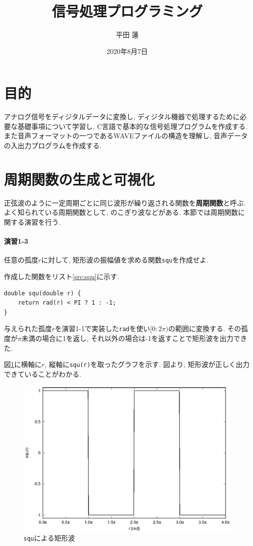\documentclass[titlepage]{jsarticle}
\title{信号処理プログラミング}
\author{平田 蓮}
\date{2020年8月7日}
\begin{document}
\maketitle
\section{目的}
    アナログ信号をディジタルデータに変換し, ディジタル機器で処理するために必要な基礎事項について学習し,
    C言語で基本的な信号処理プログラムを作成する.
    また音声フォーマットの一つであるWAVEファイルの構造を理解し, 音声データの入出力プログラムを作成する.

\section{周期関数の生成と可視化}
    正弦波のように一定周期ごとに同じ波形が繰り返される関数を\textbf{周期関数}と呼ぶ.
    よく知られている周期関数として, のこぎり波などがある.
    本節では周期関数に関する演習を行う.

    \paragraph{演習1-3} 任意の孤度$r$に対して, 矩形波の振幅値を求める関数\verb|squ|を作成せよ.

        作成した関数をリスト\ref{src:squ}に示す.

        \begin{lstlisting}[caption=squ.c, label=src:squ]
double squ(double r) {
    return rad(r) < PI ? 1 : -1;
}\end{lstlisting}

        与えられた孤度$r$を演習1-1で実装した\verb|rad|を使い$[0:2\pi)$の範囲に変換する.
        その孤度が$\pi$未満の場合に1を返し, それ以外の場合は-1を返すことで矩形波を出力できた.

        図\ref{fig:squ}に横軸に$r$, 縦軸に\verb|squ(r)|を取ったグラフを示す.
        図より, 矩形波が正しく出力できていることがわかる.

        \begin{figure}[h]
            \centering
            \includegraphics[width=0.8\hsize]{images/squ.eps}
            \cprotect\caption{\verb|squ|による矩形波}
            \label{fig:squ}
        \end{figure}
\end{document}
